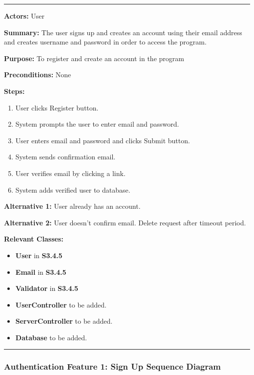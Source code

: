 \documentclass[twoside,letterpaper]{article}
\begin{document}
\vspace{2pt}
\hrule
\vspace{8pt}
\textbf{Actors:} User \newline

\noindent\textbf{Summary:} The user signs up and creates an account using their email address and creates username and password in order to access the program. \newline

\noindent\textbf{Purpose:} To register and create an account in the program \newline

\noindent\textbf{Preconditions:} None \newline

\noindent\textbf{Steps:} \begin{enumerate}
	\item User clicks Register button.
	\item System prompts the user to enter email and password.
	\item User enters email and password and clicks Submit button.
	\item System sends confirmation email.
	\item User verifies email by clicking a link.
	\item System adds verified user to database.
\end{enumerate}
\noindent\textbf{Alternative 1:} User already has an account. \newline

\noindent\textbf{Alternative 2:} User doesn't confirm email. Delete request after timeout period. \newline

\noindent\textbf{Relevant Classes:}
\begin{itemize}
	\item \textbf{User} in \textbf{S3.4.5}
	\item \textbf{Email} in \textbf{S3.4.5}
	\item \textbf{Validator} in \textbf{S3.4.5}
	\item \textbf{UserController} to be added.
	\item \textbf{ServerController} to be added.
	\item \textbf{Database} to be added.
\end{itemize}
\vspace{8pt}
\hrule
\newpage

\subsubsection[Authentication Feature 1: Sign Up Sequence Diagram]{\rmfamily\bfseries\color{black}
	Authentication Feature 1: Sign Up Sequence Diagram}
\hypertarget{RefHeading22059017292}{}
\end{document}
